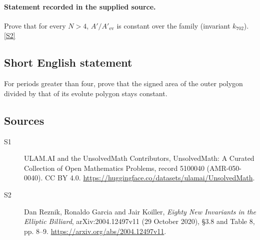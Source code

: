 \documentclass[11pt]{article}
\newcommand{\sref}[2]{\hyperlink{source:#1:#2}{[S#2]}}
\begin{document}
\paragraph{Statement recorded in the supplied source.}
Prove that for every $N>4$, $A'/A'_{\mathrm{ev}}$ is constant over the family (invariant $k_{702}$). \sref{5100040}{2}
\subsection{Short English statement}
For periods greater than four, prove that the signed area of the outer polygon divided by that of its evolute polygon stays constant.
\subsection{Sources}
\begin{description}
\item[\hypertarget{source:5100040:1}{S1}] ULAM.AI and the UnsolvedMath Contributors, UnsolvedMath: A Curated Collection of Open Mathematics Problems, record 5100040 (AMR-050-0040). CC BY 4.0. \url{https://huggingface.co/datasets/ulamai/UnsolvedMath}.
\item[\hypertarget{source:5100040:2}{S2}] Dan Reznik, Ronaldo Garcia and Jair Koiller, \emph{Eighty New Invariants in the Elliptic Billiard}, arXiv:2004.12497v11 (29 October 2020), \S3.8 and Table 8, pp. 8--9. \url{https://arxiv.org/abs/2004.12497v11}.
\end{description}
\label{end:5100040}
\end{document}

